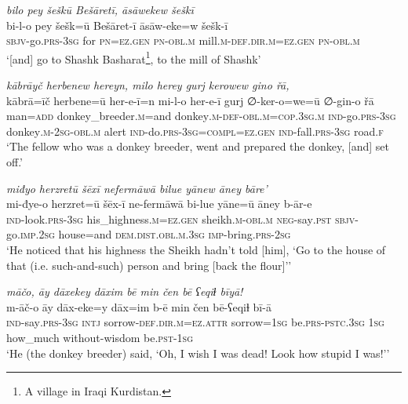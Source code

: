 \ea \label{HB.12}
\textit{bilo pey šeškū Bešāretī, āsāwekew šeškī} \\ 
\gll bi-l-o pey šešk=ū Bešāret-ī āsāw-eke=w šešk-ī \\ 
 \textsc{sbjv-}go\textsc{.prs}\textsc{-3sg} for \textsc{pn}\textsc{=ez}\textsc{.gen} \textsc{pn}\textsc{-obl}\textsc{.m} mill\textsc{.m}\textsc{-def}\textsc{.dir}\textsc{.m}\textsc{=ez}\textsc{.gen} \textsc{pn}\textsc{-obl}\textsc{.m} \\ 
\glt `[and] go to Shashk Basharat\footnote{A village in Iraqi Kurdistan.}, to the mill of Shashk'
\z 
 
\ea \label{HB.15}
\textit{kābrāyč herbenew hereyn, milo herey gurj kerowew gino řā,} \\ 
\gll kābrā=īč herbene=ū her-e-ī=n mi-l-o her-e-ī gurj ∅-ker-o=we=ū ∅-gin-o řā \\ 
 man\textsc{=add} donkey\_breeder\textsc{.m}=and donkey\textsc{.m}\textsc{-def}\textsc{-obl}\textsc{.m}\textsc{=cop}\textsc{.3sg}\textsc{.m} \textsc{ind-}go\textsc{.prs}\textsc{-3sg} donkey\textsc{.m}-\textsc{2sg}\textsc{-obl}\textsc{.m} alert \textsc{ind-}do\textsc{.prs}\textsc{-3sg}\textsc{=\textsc{compl}}\textsc{=ez}\textsc{.gen} \textsc{ind-}fall\textsc{.prs}\textsc{-3sg} road\textsc{\textsc{.f}} \\ 
\glt `The fellow who was a donkey breeder, went and prepared the donkey, [and] set off.'
\z 
 
\ea \label{HB.17}
\textit{miđyo herzretū šēxī nefermāwā bilue yānew āney bāre’} \\ 
\gll mi-đye-o herzret=ū šēx-ī ne-fermāwā bi-lue yāne=ū āney b-ār-e \\ 
 \textsc{ind-}look\textsc{.prs}\textsc{-3sg} his\_highness\textsc{.m}\textsc{=ez}\textsc{.gen} sheikh\textsc{.m}\textsc{-obl}\textsc{.m} \textsc{neg-}say\textsc{.pst} \textsc{sbjv-}go\textsc{.imp}\textsc{.\textsc{2sg}} house=and \textsc{dem.dist}\textsc{.obl}\textsc{.m}\textsc{.3sg} \textsc{imp-}bring\textsc{.prs}-\textsc{2sg} \\ 
\glt `He noticed that his highness the Sheikh hadn’t told [him], ‘Go to the house of that (i.e. such-and-such) person and bring [back the flour]’'
\z 
 
\ea \label{HB.19}
\textit{māčo, āy dāxekey dāxim bē min čen bē ʕeqiɫ bīyā!} \\ 
\gll m-āč-o āy dāx-eke=y dāx=im b-ē min čen bē-ʕeqiɫ bī-ā \\ 
 \textsc{ind-}say\textsc{.prs}\textsc{-3sg} \textsc{intj} sorrow\textsc{-def}\textsc{.dir}\textsc{.m}\textsc{=ez}.\textsc{attr} sorrow\textsc{=1sg} be\textsc{.prs}\textsc{-pstc}\textsc{.3sg} \textsc{1sg} how\_much without-wisdom be\textsc{.pst}\textsc{-1sg} \\ 
\glt `He (the donkey breeder) said, ‘Oh, I wish I was dead! Look how stupid I was!’'
\z 
 
